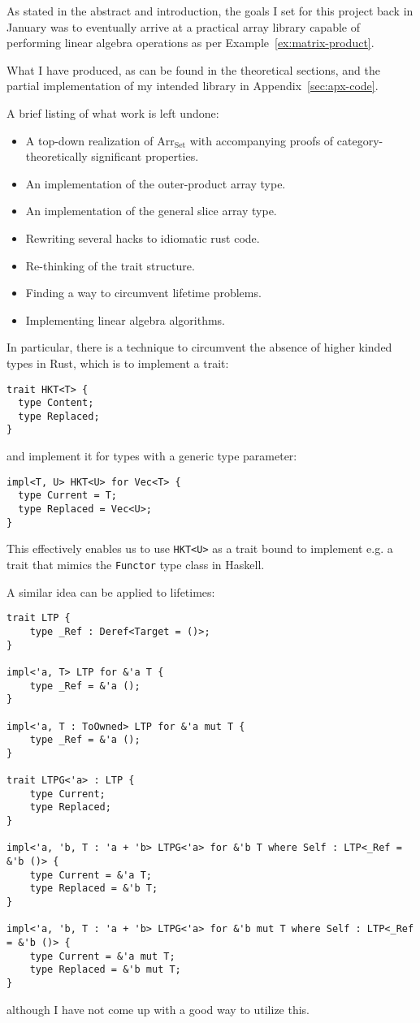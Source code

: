\documentclass{DIKU-report-variant}
\newcommand\mrm[1]{\mathrm{#1}}
\newcommand\brm[1]{\bm{\mrm{#1}}}
\newcommand\Arr[1]{{\brm{Arr}_{\brm{#1}}}}
\begin{document}
As stated in the abstract and introduction, the goals I set for this project
back in January was to eventually arrive at a practical array library capable
of performing linear algebra operations as per Example~\ref{ex:matrix-product}.

What I have produced, as can be found in the theoretical sections, and the partial
implementation of my intended library in Appendix~\ref{sec:apx-code}.

A brief listing of what work is left undone:
\begin{itemize}
  \item A top-down realization of \(\Arr{\brm{Set}}\) with accompanying
    proofs of category-theoretically significant properties.
  \item An implementation of the outer-product array type.
  \item An implementation of the general slice array type.
  \item Rewriting several hacks to idiomatic rust code.
  \item Re-thinking of the trait structure.
  \item Finding a way to circumvent lifetime problems.
  \item Implementing linear algebra algorithms.
\end{itemize}

In particular, there is a technique to circumvent the absence of
higher kinded types in Rust, which is to implement a trait\cite{HKT15}:
\begin{lstlisting}
trait HKT<T> {
  type Content;
  type Replaced;
}
\end{lstlisting}
and implement it for types with a generic type parameter:
\begin{lstlisting}
impl<T, U> HKT<U> for Vec<T> {
  type Current = T;
  type Replaced = Vec<U>;
}
\end{lstlisting}

This effectively enables us to use \texttt{HKT<U>} as a trait bound
to implement e.g. a trait that mimics the \texttt{Functor} type class in Haskell.

A similar idea can be applied to lifetimes:
\begin{lstlisting}
trait LTP {
    type _Ref : Deref<Target = ()>;
}

impl<'a, T> LTP for &'a T {
    type _Ref = &'a ();
}

impl<'a, T : ToOwned> LTP for &'a mut T {
    type _Ref = &'a ();
}

trait LTPG<'a> : LTP {
    type Current;
    type Replaced;
}

impl<'a, 'b, T : 'a + 'b> LTPG<'a> for &'b T where Self : LTP<_Ref = &'b ()> {
    type Current = &'a T;
    type Replaced = &'b T;
}

impl<'a, 'b, T : 'a + 'b> LTPG<'a> for &'b mut T where Self : LTP<_Ref = &'b ()> {
    type Current = &'a mut T;
    type Replaced = &'b mut T;
}
\end{lstlisting}
although I have not come up with a good way to utilize this.
\end{document}
